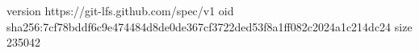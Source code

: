 version https://git-lfs.github.com/spec/v1
oid sha256:7cf78bddf6c9e474484d8de0de367cf3722ded53f8a1ff082c2024a1c214dc24
size 235042
